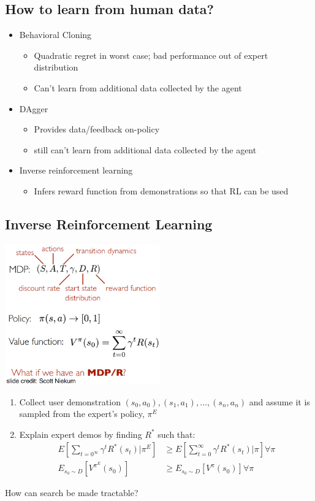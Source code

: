 \documentclass[10pt]{article}
\begin{document}
\subsection*{How to learn from human data?}
\begin{itemize}
	\item Behavioral Cloning
	\begin{itemize}
        \item Quadratic regret in worst case; bad performance out of expert distribution
        \item Can't learn from additional data collected by the agent
    \end{itemize}
	\item DAgger
	\begin{itemize}
        \item Provides data/feedback on-policy
        \item still can't learn from additional data collected by the agent
    \end{itemize}
    \item Inverse reinforcement learning
    \begin{itemize}
        \item Infers reward function from demonstrations so that RL can be used
    \end{itemize}
\end{itemize}

\subsection*{Inverse Reinforcement Learning}
\begin{center}
    \includegraphics*[width=0.5\textwidth]{L2_23.png}
\end{center}

\begin{enumerate}
    \item Collect user demonstration $(s_0, a_0), (s_1, a_1), \dots, (s_n, a_n)$ and assume it is sampled from the expert's policy, $\pi^E$
    \item Explain expert demos by finding $R^*$ such that:
    \begin{align*}
        E[\sum_{t = 0^\infty} \gamma^t R^* (s_t) | \pi^E] &\geq E[\sum_{t = 0}^\infty \gamma^t R^* (s_t) | \pi] \forall \pi\\
        E_{s_0 \sim D} [V^{\pi^E} (s_0)] &\geq E_{s_0 \sim D}[V^\pi (s_0)] \forall \pi
    \end{align*}
\end{enumerate}
How can search be made tractable?
\end{document}
